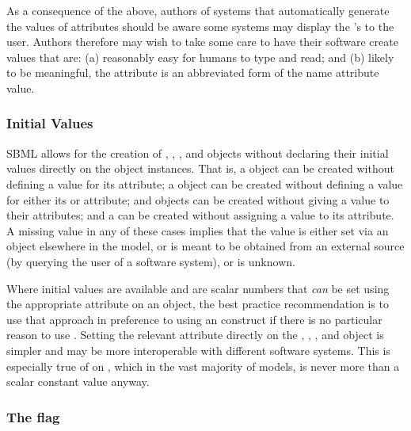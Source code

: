 As a consequence of the above, authors of systems that
automatically generate the values of  attributes should
be aware some systems may display the 's to the user.
Authors therefore may wish to take some care to have their
software create  values that are: (a) reasonably easy
for humans to type and read; and (b) likely to be meaningful, \eg
the  attribute is an abbreviated form of the name
attribute value.


\subsubsection{Initial Values}
\label{sec:bp:initialvalues}

SBML allows for the creation of \Compartment, \Species,
\Parameter, \LocalParameter and \SpeciesReference objects without
declaring their initial values directly on the object instances.
That is, a \Compartment object can be created without defining a
value for its  attribute; a \Species object can be
created without defining a value for either its
 or  attribute;
\Parameter and \LocalParameter objects can be created without
giving a value to their  attributes; and a
\SpeciesReference can be created without assigning a value to its
 attribute.  A missing value in any of these
cases implies that the value is either set via an
\InitialAssignment object elsewhere in the model, or is meant to
be obtained from an external source (\eg by querying the user of a
software system), or is unknown.

Where initial values are available and are scalar numbers that
\emph{can} be set using the appropriate attribute on an object,
the best practice recommendation is to use that approach in
preference to using an \InitialAssignment construct if there is no
particular reason to use \InitialAssignment.  Setting the relevant
attribute directly on the \Compartment, \Species, \Parameter,
\LocalParameter and \SpeciesReference object is simpler and may be
more interoperable with different software systems.  This is
especially true of  on \SpeciesReference,
which in the vast majority of models, is never more than a scalar
constant value anyway.


\subsubsection{The  flag}
\label{sec:bp:constant}

